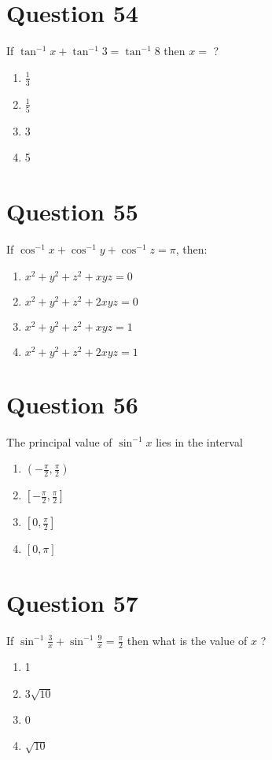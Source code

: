 \documentclass{article}
\begin{document}
\section*{Question 54}
If \(\tan ^{-1} x+\tan ^{-1} 3=\tan ^{-1} 8\) then \(x=\) ?
\begin{enumerate}[label=(\alph*)]
\item \(\frac{1}{3}\)
\item \(\frac{1}{5}\)
\item 3
\item 5
\end{enumerate}
\newpage
\section*{Question 55}
If \(\cos ^{-1} x+\cos ^{-1} y+\cos ^{-1} z=\pi\), then:
\begin{enumerate}[label=(\alph*)]
\item \( x^2+y^2+z^2+x y z=0\)
\item \(x ^2+ y ^2+ z ^2+2 xyz =0\)
\item  \( x^2+y^2+z^2+x y z=1\)
\item \(x ^2+ y ^2+ z ^2+2 xyz =1\)
\end{enumerate}
\newpage
\section*{Question 56}
The principal value of \(\sin ^{-1} x\) lies in the interval
\begin{enumerate}[label=(\alph*)]
\item \(\left(-\frac{\pi}{2}, \frac{\pi}{2}\right)\)
\item \(\left[-\frac{\pi}{2}, \frac{\pi}{2}\right]\)
\item \(\left[0, \frac{\pi}{2}\right]\)
\item \([0, \pi]\)
\end{enumerate}
\newpage
\section*{Question 57}
If \(\sin ^{-1} \frac{3}{x}+\sin ^{-1} \frac{9}{x}=\frac{\pi}{2}\) then what is the value of \(x\) ?\newline
\begin{enumerate}[label=(\alph*)]
\item 1\newline
\item \(3 \sqrt{10}\)\newline
\item 0\newline
\item \(\sqrt{10}\)\newline
\end{enumerate}
\newpage
\end{document}
